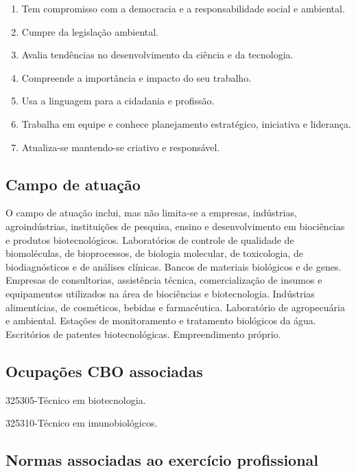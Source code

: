 \documentclass[11pt,fleqn]{book} %
\begin{document}
\begin{enumerate}
	\item\label{perfil14} Tem compromisso com a democracia e a responsabilidade social e ambiental.
	\item\label{perfil15} Cumpre da legislação ambiental.
	\item\label{perfil16} Avalia tendências no desenvolvimento da ciência e da tecnologia.
	\item\label{perfil17} Compreende a importância e impacto do seu trabalho.
	\item\label{perfil18} Usa a linguagem para a cidadania e profissão.
	\item\label{perfil19} Trabalha em equipe e conhece planejamento estratégico, iniciativa e liderança.
	\item\label{perfil20} Atualiza-se mantendo-se criativo e responsável.
\end{enumerate}


\subsection{Campo de atuação}
\indent

O campo de atuação inclui, mas não limita-se a empresas, indústrias, agroindústrias, instituições de pesquisa, ensino e desenvolvimento em biociências e produtos biotecnológicos.
Laboratórios de controle de qualidade de biomoléculas, de bioprocessos, de biologia molecular, de toxicologia, de biodiagnósticos e de análises clínicas. 
Bancos de materiais biológicos e de genes. 
Empresas de consultorias, assistência técnica, comercialização de insumos e equipamentos utilizados na área de biociências e biotecnologia. 
Indústrias alimentícias, de cosméticos, bebidas e farmacêutica. 
Laboratório de agropecuária e ambiental. 
Estações de monitoramento e tratamento biológicos da água. 
Escritórios de patentes biotecnológicas. 
Empreendimento próprio.

\subsection{Ocupações CBO associadas}
\indent

325305-Técnico em biotecnologia. 

325310-Técnico em imunobiológicos.

\subsection{Normas associadas ao exercício profissional}
\indent
\end{document}
